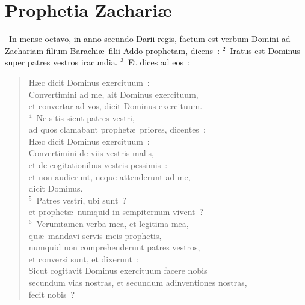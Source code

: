 {\centering \section*{Prophetia Zachariæ}}\thispagestyle{empty}

~\lettrine[lines=10,image=true,loversize=0.05,lraise=-0.03]{I}{}n mense octavo, in anno secundo Darii regis, factum est verbum Domini ad Zachariam filium Barachi\ae\ filii Addo prophetam, dicens~:
${}^{2}$~Iratus est Dominus super patres vestros iracundia.
${}^{3}$~Et dices ad eos~: \begin{flushleft}\begin{verse}H\ae c dicit Dominus exercituum~:\\ Convertimini ad me, ait Dominus exercituum,\\ et convertar ad vos, dicit Dominus exercituum.\\
${}^{4}$~Ne sitis sicut patres vestri,\\ ad quos clamabant prophet\ae\ priores, dicentes~:\\ H\ae c dicit Dominus exercituum~:\\ Convertimini de viis vestris malis,\\ et de cogitationibus vestris pessimis~:\\ et non audierunt, neque attenderunt ad me,\\ dicit Dominus.\\
${}^{5}$~Patres vestri, ubi sunt~?\\ et prophet\ae\ numquid in sempiternum vivent~?\\
${}^{6}$~Verumtamen verba mea, et legitima mea,\\ qu\ae\ mandavi servis meis prophetis,\\ numquid non comprehenderunt patres vestros,\\ et conversi sunt, et dixerunt~:\\ Sicut cogitavit Dominus exercituum facere nobis\\ secundum vias nostras, et secundum adinventiones nostras,\\ fecit nobis~?\end{verse}\end{flushleft}


